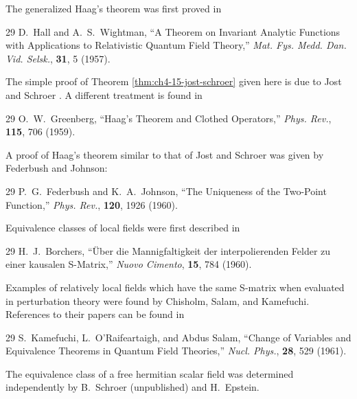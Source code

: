 The generalized Haag's theorem was first proved in

\begin{thebibliography}{29}
\setcounter{NAT@ctr}{21}
 D.~Hall and A.~S.~Wightman, ``A Theorem on Invariant Analytic
Functions with Applications to Relativistic Quantum Field Theory,''
\emph{Mat. Fys. Medd. Dan. Vid. Selsk.}, \textbf{31}, 5 (1957).
\end{thebibliography}

The simple proof of Theorem \ref{thm:ch4-15-jost-schroer} given here is due to Jost and Schroer
\cite{ch4-5}. A different treatment is found in

\begin{thebibliography}{29}
\setcounter{NAT@ctr}{22}
 O.~W.~Greenberg, ``Haag's Theorem and Clothed Operators,''
\emph{Phys. Rev.}, \textbf{115}, 706 (1959).
\end{thebibliography}

A proof of Haag's theorem similar to that of Jost and Schroer was given by
Federbush and Johnson:

\begin{thebibliography}{29}
\setcounter{NAT@ctr}{23}
 P.~G.~Federbush and K.~A.~Johnson, ``The Uniqueness of the
Two-Point Function,'' \emph{Phys. Rev.}, \textbf{120}, 1926 (1960).
\end{thebibliography}

Equivalence classes of local fields were first described in

\begin{thebibliography}{29}
\setcounter{NAT@ctr}{24}
 H.~J.~Borchers, ``\"Uber die Mannig\-faltigkeit der inter\-polierenden
Felder zu einer kausalen S-Matrix,'' \emph{Nuovo Cimento}, \textbf{15}, 784
(1960).
\end{thebibliography}

Examples of relatively local fields which have the same S-matrix when
evaluated in perturbation theory were found by Chisholm, Salam, and
Kamefuchi. References to their papers can be found in

\begin{thebibliography}{29}
\setcounter{NAT@ctr}{25}
 S.~Kamefuchi, L.~O'Raifeartaigh, and Abdus Salam, ``Change of
Variables and Equivalence Theorems in Quantum Field Theories,'' \emph{Nucl.
Phys.}, \textbf{28}, 529 (1961).
\end{thebibliography}

The equivalence class of a free hermitian scalar field was determined
independently by B.~Schroer (unpublished) and H.~Epstein.

